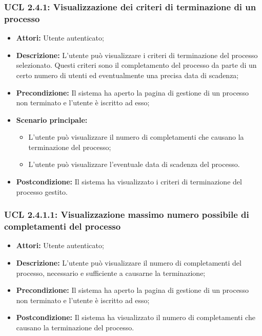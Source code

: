 \subsubsection{UCL 2.4.1: Visualizzazione dei criteri di terminazione di un processo}
\begin{itemize}
\item \textbf{Attori:} Utente autenticato;
\item \textbf{Descrizione:} L'utente può visualizzare i criteri di terminazione del processo selezionato. Questi criteri sono il completamento del processo da parte di un certo numero di utenti ed eventualmente una precisa data di scadenza;
\item \textbf{Precondizione:} Il sistema ha aperto la pagina di gestione di un processo non terminato e l'utente è iscritto ad esso;
\item \textbf{Scenario principale:}
\begin{itemize}
\item L'utente può visualizzare il numero di completamenti che causano la terminazione del processo;
\item L'utente può visualizzare l'eventuale data di scadenza del processo.
\end{itemize}
\item \textbf{Postcondizione:} Il sistema ha visualizzato i criteri di terminazione del processo gestito.
\end{itemize}

\hypertarget{L2.4.1.1}{}
\subsubsection{UCL 2.4.1.1: Visualizzazione massimo numero possibile di completamenti del processo}
\begin{itemize}
\item \textbf{Attori:} Utente autenticato;
\item \textbf{Descrizione:} L'utente può visualizzare il numero di completamenti del processo, necessario e sufficiente a causarne la terminazione;
\item \textbf{Precondizione:} Il sistema ha aperto la pagina di gestione di un processo non terminato e l'utente è iscritto ad esso;
\item \textbf{Postcondizione:} Il sistema ha visualizzato il numero di completamenti che causano la terminazione del processo.
\end{itemize}

